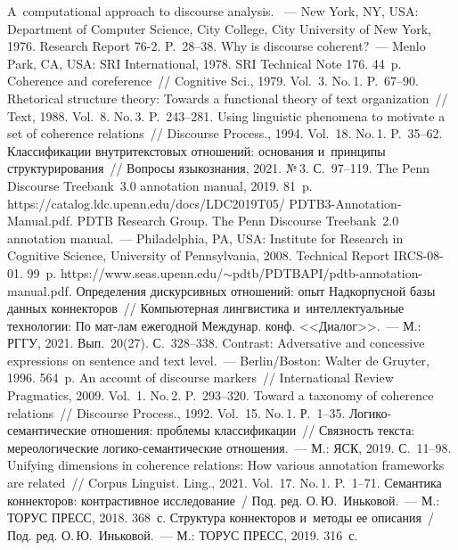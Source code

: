 \begin{multicols}{2}
{{\begin{thebibliography}{99}
 A~computational approach to discourse analysis. ~--- New York, NY, USA: 
Department of Computer Science, City College, City University of New York, 1976. Research Report 76-2.
P.~28--38.
 Why is discourse coherent?~--- Menlo Park, CA, USA: 
SRI International, 1978. SRI Technical Note 176. 44~p.
 Coherence and coreference~// Cognitive Sci., 1979. Vol.~3. No.\,1. P.~67--90. 
 Rhetorical structure theory: Towards a functional theory of text 
organization~// Text, 1988. Vol.~8. No.\,3. P.~243--281. 
 Using linguistic phenomena to motivate a set of coherence relations~// 
Discourse Process., 1994. Vol.~18. No.\,1. 
P.~35--62.
 Классификации внутритекстовых отношений: основания и~принципы 
структурирования~// Вопросы языкознания, 2021. №\,3. С.~97--119. 
 The Penn Discourse Treebank~3.0 annotation 
manual, 2019. 81~p. {\sf https://catalog.ldc.upenn.edu/docs/LDC2019T05/ PDTB3-Annotation-Manual.pdf}.
PDTB Research Group. The Penn Discourse Treebank~2.0 annotation manual.~--- 
Philadelphia, PA, USA: Institute for Research in Cognitive Science, University of 
Pennsylvania, 2008. Technical Report IRCS-08-01. 99~p. 
{\sf https://www.seas.upenn.edu/$\sim$pdtb/PDTBAPI/pdtb-annotation-manual.pdf}.
 Определения дискурсивных отношений: опыт Надкорпусной базы 
данных коннекторов~// Компьютерная лингвистика и~интеллектуальные технологии: По 
мат-лам ежегодной \mbox{Междунар.} конф. <<Диалог>>.~--- М.: РГГУ, 2021. Вып.~20(27). С.~328--338.
 Contrast: Adversative and concessive expressions on sentence and text level.~--- 
Berlin/Boston: Walter de Gruyter, 1996. 564~p.
 An account of discourse markers~// International Review Pragmatics, 2009. Vol.~1. 
No.\,2. P.~293--320.
 Toward a taxonomy of coherence relations~// 
Discourse Process., 1992. Vol.~15. No.\,1. Р.~1--35.
 Логико-семантические отношения: проблемы классификации~// 
Связ\-ность текста: мереологические 
ло\-ги\-ко-се\-ман\-ти\-че\-ские отношения.~--- М.: ЯСК, 2019. С.~11--98.
Unifying dimensions in coherence relations: How various annotation frameworks are 
related~// Corpus Linguist. Ling., 2021. Vol.~17. No.\,1. P.~1--71.
Семантика коннекторов: контрастивное исследование~/ Под. ред. О.\,Ю.~Иньковой.~--- 
М.: ТОРУС ПРЕСС, 2018. 368~с.
Структура коннекторов и~методы ее описания~/ Под. ред. О.\,Ю.~Иньковой.~--- М.: 
ТОРУС ПРЕСС, 2019. 316~с.

\end{thebibliography}

 }
 }

\end{multicols}

